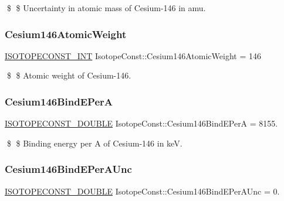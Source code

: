 \$ \$ Uncertainty in atomic mass of Cesium-\/146 in amu. \mbox{\label{group___isotope_const-_cesium-_cs146_gaaa4394b8860efa0d96937ae6e5709a85}} 
\subsubsection{\texorpdfstring{Cesium146\+Atomic\+Weight}{Cesium146AtomicWeight}}
{\footnotesize\ttfamily \mbox{\hyperlink{group___isotope_const-_macros_ga5f18360b3e99483a35c32d789e62621c}{I\+S\+O\+T\+O\+P\+E\+C\+O\+N\+S\+T\+\_\+\+I\+NT}} Isotope\+Const\+::\+Cesium146\+Atomic\+Weight = 146}

\$ \$ Atomic weight of Cesium-\/146. \mbox{\label{group___isotope_const-_cesium-_cs146_ga0364022337c3ff269569fb2c0b19e3fe}} 
\subsubsection{\texorpdfstring{Cesium146\+Bind\+E\+PerA}{Cesium146BindEPerA}}
{\footnotesize\ttfamily \mbox{\hyperlink{group___isotope_const-_macros_ga8f45a7272ce02c0b4c65c44636ed719a}{I\+S\+O\+T\+O\+P\+E\+C\+O\+N\+S\+T\+\_\+\+D\+O\+U\+B\+LE}} Isotope\+Const\+::\+Cesium146\+Bind\+E\+PerA = 8155.}

\$ \$ Binding energy per A of Cesium-\/146 in keV. \mbox{\label{group___isotope_const-_cesium-_cs146_ga13cc1b1ef6b9842fab7b1bc084b952a2}} 
\subsubsection{\texorpdfstring{Cesium146\+Bind\+E\+Per\+A\+Unc}{Cesium146BindEPerAUnc}}
{\footnotesize\ttfamily \mbox{\hyperlink{group___isotope_const-_macros_ga8f45a7272ce02c0b4c65c44636ed719a}{I\+S\+O\+T\+O\+P\+E\+C\+O\+N\+S\+T\+\_\+\+D\+O\+U\+B\+LE}} Isotope\+Const\+::\+Cesium146\+Bind\+E\+Per\+A\+Unc = 0.}

